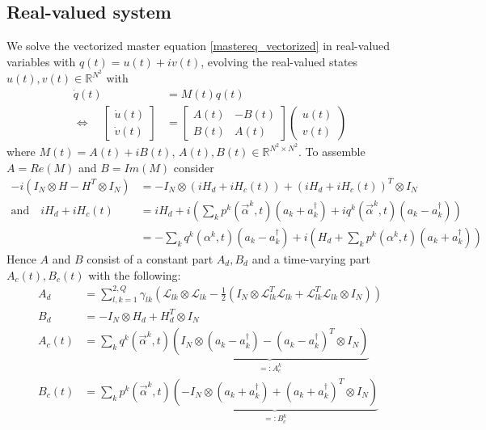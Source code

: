 \documentclass[letterpaper]{article}
\newcommand{\Ell}{\mathcal{L}}
\newcommand{\R}{\mathds{R}}
\begin{document}
  \subsection{Real-valued system}
   We solve the vectorized master equation \eqref{mastereq_vectorized} in
   real-valued variables with $q(t) = u(t) + iv(t)$, evolving the real-valued
   states $u(t), v(t)\in \R^{N^2}$ with
   \begin{align}
     \dot q(t) &= M(t) q(t) \\
   \Leftrightarrow \quad \begin{bmatrix} \dot u(t) \\ \dot v(t) \end{bmatrix} &= 
   \begin{bmatrix} A(t) & -B(t) \\ B(t) & A(t) \end{bmatrix} 
   \begin{pmatrix} u(t) \\ v(t) \end{pmatrix} 
   \label{realvaluedODE}
   \end{align}
   where $M(t) = A(t) + i B(t)$, $A(t), B(t)\in \R^{N^2\times N^2}$. To assemble
   $A = Re(M)$ and $B = Im(M)$ consider
   \begin{align}
     -i(I_N \otimes H - H^T \otimes I_N) &= -I_N \otimes \left(iH_d +
     iH_c(t)\right) + \left(iH_d + iH_c(t)\right)^T \otimes I_N \\
     \text{and} \quad iH_d + iH_c(t) &= i H_d + i\left( \sum_k
     p^k(\vec{\alpha}^k,t)(a_k + a_k^{\dagger}) + iq^k(\vec{\alpha}^k,t)(a_k -
     a_k^{\dagger})\right) \\
                    &= - \sum_k q^k(\alpha^k,t)(a_k - a_k^{\dagger}) + i\left(
                    H_d + \sum_k p^k(\alpha^k,t)(a_k+a_k^{\dagger}) \right) 
   \end{align}
   Hence $A$ and $B$ consist of a constant part $A_d, B_d$ and a time-varying
   part $A_c(t), B_c(t)$ with the following:
   \begin{align}
     A_d &=  \sum_{l,k=1}^{2,Q}\gamma_{lk} \left( \Ell_{lk}\otimes\Ell_{lk} -
     \frac 1 2 \left(I_N \otimes \Ell_{lk}^T\Ell_{lk} +
     \Ell_{lk}^T\Ell_{lk}\otimes I_N\right) \right)\\
     B_d &= -I_N \otimes H_d + H_d^T \otimes I_N \\
     A_c(t) &= \sum_k q^k(\vec{\alpha}^k,t) \underbrace{\left( I_N \otimes
     \left(a_k - a_k^{\dagger}\right) - \left(a_k -
     a_k^{\dagger}\right)^T\otimes I_N \right)}_{=:A_c^k} \\
     B_c(t) &= \sum_k p^k(\vec{\alpha}^k,t) \underbrace{\left( - I_N \otimes
     \left(a_k + a_k^{\dagger}\right) + \left(a_k +
     a_k^{\dagger}\right)^T\otimes I_N \right)}_{=:B_c^k} 
   \end{align}
\end{document}
